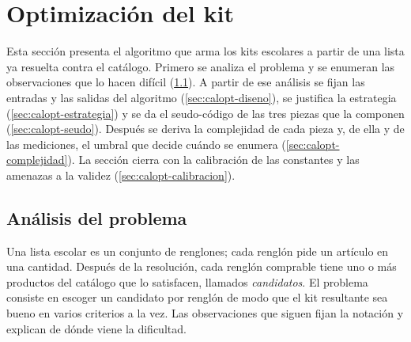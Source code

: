 
\section{Optimización del kit}
\label{sec:calopt}

Esta sección presenta el algoritmo que arma los kits escolares a partir de una
lista ya resuelta contra el catálogo. Primero se analiza el problema y se
enumeran las observaciones que lo hacen difícil
(\cref{sec:calopt-analisis}). A partir de ese análisis se fijan las entradas y
las salidas del algoritmo (\cref{sec:calopt-diseno}), se justifica la
estrategia (\cref{sec:calopt-estrategia}) y se da el seudo-código de las tres
piezas que la componen (\cref{sec:calopt-seudo}). Después se deriva la
complejidad de cada pieza y, de ella y de las mediciones, el umbral que decide
cuándo se enumera (\cref{sec:calopt-complejidad}). La sección cierra con la
calibración de las constantes y las amenazas a la validez
(\cref{sec:calopt-calibracion}).

\subsection{Análisis del problema}
\label{sec:calopt-analisis}

Una lista escolar es un conjunto de renglones; cada renglón pide un artículo en
una cantidad. Después de la resolución, cada renglón comprable tiene uno o más
productos del catálogo que lo satisfacen, llamados \emph{candidatos}. El
problema consiste en escoger un candidato por renglón de modo que el kit
resultante sea bueno en varios criterios a la vez. Las observaciones que siguen
fijan la notación y explican de dónde viene la dificultad.

